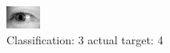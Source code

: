 \begin{figure}[h!]
\begin{center}
\includegraphics[width=0.60\columnwidth]{figures/ID3218_class_3_target_4.png}
\end{center}
\caption{ Classification: 3 actual target: 4}
\label{fig:ID3218_class_3_target_4}
\end{figure}
